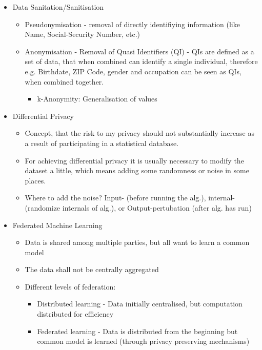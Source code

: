 \documentclass[12pt,a4paper]{article}
\begin{document}
\begin{itemize}
    \item Data Sanitation/Sanitisation
        \begin{itemize}
            \item Pseudonymisation - removal of directly identifiying information (like Name, Social-Security Number, etc.)
            \item Anonymisation - Removal of Quasi Identifiers (QI) - QIs are defined as a set of data, that when combined can identify a single individual, therefore e.g. Birthdate, ZIP Code, gender and occupation can be seen as QIs, when combined together.
                \begin{itemize}
                    \item k-Anonymity: Generalisation of values
                \end{itemize}
        \end{itemize}
    \item Differential Privacy
        \begin{itemize}
            \item Concept, that the risk to my privacy should not substantially increase as a result of participating in a statistical database.
            \item For achieving differential privacy it is usually necessary to modify the dataset a little, which means adding some randomness or noise in some places.
            \item Where to add the noise? Input- (before running the alg.), internal- (randomize internals of alg.), or Output-pertubation (after alg. has run)
        \end{itemize}
    \item Federated Machine Learning
        \begin{itemize}
            \item Data is shared among multiple parties, but all want to learn a common model
            \item The data shall not be centrally aggregated
            \item Different levels of federation:
                \begin{itemize}
                    \item Distributed learning - Data initially centralised, but computation distributed for efficiency
                    \item Federated learning - Data is distributed from the beginning but common model is learned (through privacy preserving mechanisms)

\end{itemize}
\end{itemize}
\end{itemize}
\end{document}
